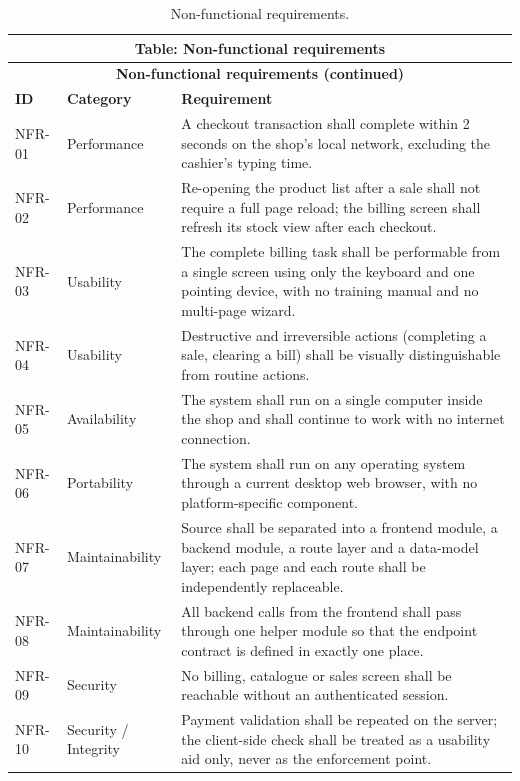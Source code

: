 \documentclass[11pt,a4paper]{article}
\begin{document}
\begin{longtable}{@{}p{}p{}p{}@{}}
\caption{Non-functional requirements.}\label{tab:nfr}\\
\toprule
\multicolumn{3}{c}{\sffamily\bfseries\color{navy} Table: Non-functional requirements}\\
\midrule
\endfirsthead
\toprule
\multicolumn{3}{c}{\sffamily\bfseries\color{navy} Non-functional requirements (continued)}\\
\midrule
\endhead
\bottomrule
\endfoot
\textbf{ID} & \textbf{Category} & \textbf{Requirement}\\
\hline
NFR-01 & Performance & A checkout transaction shall complete within 2 seconds on the shop's local network, excluding the cashier's typing time.\\
NFR-02 & Performance & Re-opening the product list after a sale shall not require a full page reload; the billing screen shall refresh its stock view after each checkout.\\
NFR-03 & Usability & The complete billing task shall be performable from a single screen using only the keyboard and one pointing device, with no training manual and no multi-page wizard.\\
NFR-04 & Usability & Destructive and irreversible actions (completing a sale, clearing a bill) shall be visually distinguishable from routine actions.\\
NFR-05 & Availability & The system shall run on a single computer inside the shop and shall continue to work with no internet connection.\\
NFR-06 & Portability & The system shall run on any operating system through a current desktop web browser, with no platform-specific component.\\
NFR-07 & Maintainability & Source shall be separated into a frontend module, a backend module, a route layer and a data-model layer; each page and each route shall be independently replaceable.\\
NFR-08 & Maintainability & All backend calls from the frontend shall pass through one helper module so that the endpoint contract is defined in exactly one place.\\
NFR-09 & Security & No billing, catalogue or sales screen shall be reachable without an authenticated session.\\
NFR-10 & Security / Integrity & Payment validation shall be repeated on the server; the client-side check shall be treated as a usability aid only, never as the enforcement point.\\

\end{longtable}
\end{document}
